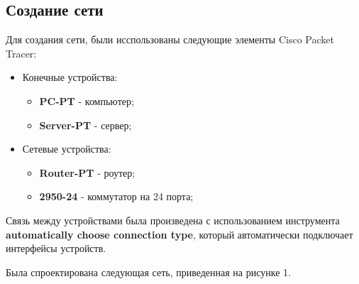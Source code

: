 \documentclass[14pt,a4paper,report]{report}
\begin{document}
\subsection{Создание сети}
Для создания сети, были исспользованы следующие элементы Cisco Packet Tracer:
\begin{itemize}
\item Конечные устройства:
\begin{itemize}
\item \textbf{PC-PT} - компьютер;
\item \textbf{Server-PT} - сервер;
\end{itemize}
\item Сетевые устройства:
\begin{itemize}
\item \textbf{Router-PT} - роутер;
\item \textbf{2950-24} - коммутатор на 24 порта;
\end{itemize}
\end{itemize}
Связь между устройствами была произведена с использованием инструмента \textbf{automatically choose connection type}, который автоматически подключает интерфейсы устройств.

Была спроектирована следующая сеть, приведенная на рисунке 1.
\end{document}
